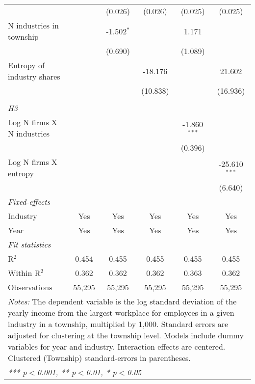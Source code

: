 \begin{tabular}{lccccc}
                                        &                  & (0.026)          & (0.026)          & (0.025)          & (0.025)\\   
   N industries in township             &                  & -1.502$^{*}$     &                  & 1.171            &   \\   
                                        &                  & (0.690)          &                  & (1.089)          &   \\   
   Entropy of industry shares           &                  &                  & -18.176          &                  & 21.602\\   
                                        &                  &                  & (10.838)         &                  & (16.936)\\   
\hdashline %
\\[0.1ex] %
\emph{H3} \\ 
   Log N firms X N industries           &                  &                  &                  & -1.860$^{***}$   &   \\   
                                        &                  &                  &                  & (0.396)          &   \\   
   Log N firms X entropy                &                  &                  &                  &                  & -25.610$^{***}$\\   
                                        &                  &                  &                  &                  & (6.640)\\   
   \midrule
   \emph{Fixed-effects}\\
   Industry                             & Yes              & Yes              & Yes              & Yes              & Yes\\  
   Year                                 & Yes              & Yes              & Yes              & Yes              & Yes\\  
   \midrule
   \emph{Fit statistics}\\
   R$^2$                                & 0.454            & 0.455            & 0.455            & 0.455            & 0.455\\  
   Within R$^2$                         & 0.362            & 0.362            & 0.362            & 0.363            & 0.362\\  
   Observations                         & 55,295           & 55,295           & 55,295           & 55,295           & 55,295\\  
   \midrule \midrule
\multicolumn{6}{p{16cm}}{\emph{Notes:} The dependent variable is the log 
    standard deviation of the yearly income from the largest workplace for 
    employees in a given industry in a township, multiplied by 1,000. Standard 
    errors are adjusted for clustering at the township level. Models include 
    dummy variables for year and industry. Interaction effects are centered. 
    Clustered (Township) standard-errors in parentheses.}\\
\multicolumn{6}{l}{\emph{*** p$<$0.001, ** p$<$0.01, * p$<$0.05}} \\ 
\end{tabular}
\par\endgroup
